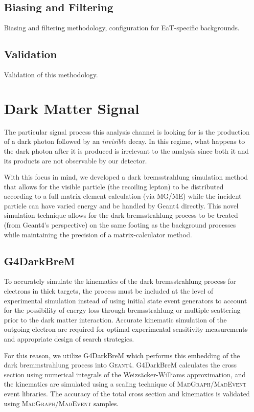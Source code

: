 \subsection{Biasing and Filtering}
Biasing and filtering methodology, configuration for EaT-specific backgrounds.

\subsection{Validation}
Validation of this methodology.

\section{Dark Matter Signal}
The particular signal process this analysis channel is looking for is the
production of a dark photon followed by an \emph{invisible} decay. In this
regime, what happens to the dark photon after it is produced is irrelevant
to the analysis since both it and its products are not observable by our
detector.

With this focus in mind, we developed a dark bremsstrahlung simulation method
that allows for the visible particle (the recoiling lepton) to be distributed
according to a full matrix element calculation (via MG/ME) while the incident
particle can have varied energy and be handled by Geant4 directly. This novel
simulation technique allows for the dark bremsstrahlung process to be treated
(from Geant4's perspective) on the same footing as the background processes
while maintaining the precision of a matrix-calculator method.

\subsection{G4DarkBreM}
To accurately simulate the kinematics of the dark bremsstrahlung process for electrons in thick targets, the process must be included at the level of experimental simulation instead of using initial state event generators to account for the possibility of energy loss through bremsstrahlung or multiple scattering prior to the dark matter interaction. Accurate kinematic simulation of the outgoing electron are required for optimal experimental sensitivity measurements and appropriate design of search strategies.

For this reason, we utilize G4DarkBreM \cite{g4darkbrem} which performs this embedding of the dark bremmstrahlung process into \textsc{Geant}4. G4DarkBreM calculates the cross section using numerical integrals of the Weizs\"{a}cker-Williams approximation, and the kinematics are simulated using a scaling technique of \textsc{MadGraph/MadEvent} event libraries. The accuracy of the total cross section and kinematics is validated using \textsc{MadGraph/MadEvent} samples.

